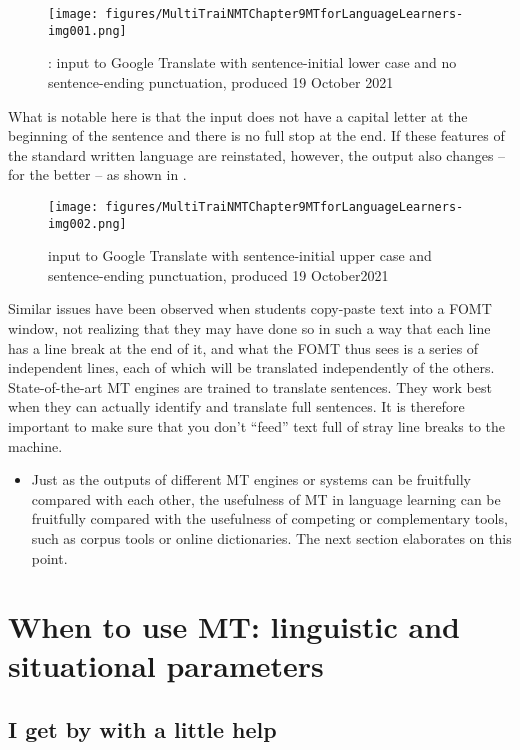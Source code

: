 \documentclass[output=paper,colorlinks,citecolor=brown,
]{langscibook}
\begin{document}
  
\begin{figure}
\texttt{[image: figures/MultiTraiNMTChapter9MTforLanguageLearners-img001.png]}
\caption{\label{fig:carre:1}: input to Google Translate with sentence-initial lower case and no sentence-ending punctuation, produced 19 October 2021}
\end{figure}


What is notable here is that the input does not have a capital letter at the beginning of the sentence and there is no full stop at the end. If these features of the standard written language are reinstated, however, the output also changes – for the better – as shown in .


  
\begin{figure}
\texttt{[image: figures/MultiTraiNMTChapter9MTforLanguageLearners-img002.png]}
 \caption{input to Google Translate with sentence-initial upper case and sentence-ending punctuation, produced 19 October2021}
\label{fig:carre:2}
\end{figure}

Similar issues have been observed when students copy-paste text into a FOMT window, not realizing that they may have done so in such a way that each line has a line break at the end of it, and what the FOMT thus sees is a series of independent lines, each of which will be translated independently of the others. State-of-the-art MT engines are trained to translate sentences. They work best when they can actually identify and translate full sentences. It is therefore important to make sure that you don’t “feed” text full of stray line breaks to the machine.

\begin{itemize}
\item Just as the outputs of different MT engines or systems can be fruitfully compared with each other, the usefulness of MT in language learning can be fruitfully compared with the usefulness of competing or complementary tools, such as corpus tools or online dictionaries. The next section elaborates on this point.
\end{itemize}

\section{When to use MT: linguistic and situational parameters}\label{sec:carre:4}
\subsection{I get by with a little help} \label{sec:carre:4.1}
\end{document}
